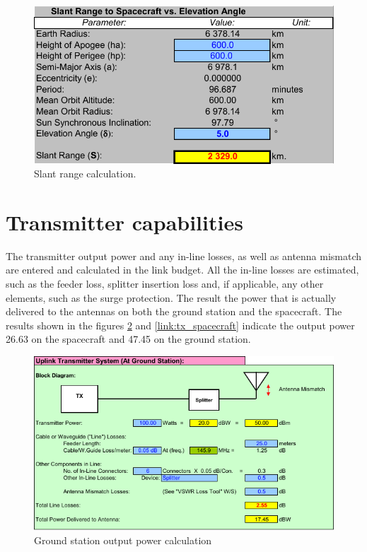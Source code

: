 \begin{figure}
    \centering
    \includegraphics[width=0.8\paperwidth]{img/8/slant_range_calc.pdf}
    \caption{Slant range calculation.}
    \label{slant_range_calc}
\end{figure}

\section{Transmitter capabilities}
The transmitter output power and any in-line losses, as well as antenna mismatch are entered and calculated in the link budget. All the in-line losses are estimated, such as the feeder loss, splitter insertion loss and, if applicable, any other elements, such as the surge protection. The result the power that is actually delivered to the antennas on both the ground station and the spacecraft. The results shown in the figures \ref{link:tx_gs} and \ref{link:tx_spacecraft} indicate the output power \SI{26.63}{\dBm} on the spacecraft and \SI{47.45}{\dBm} on the ground station.

\begin{figure}
    \centering
    \includegraphics[width=0.8\paperwidth]{img/8/tx_gs.pdf}
    \caption{Ground station output power calculation}
    \label{link:tx_gs}
\end{figure}

